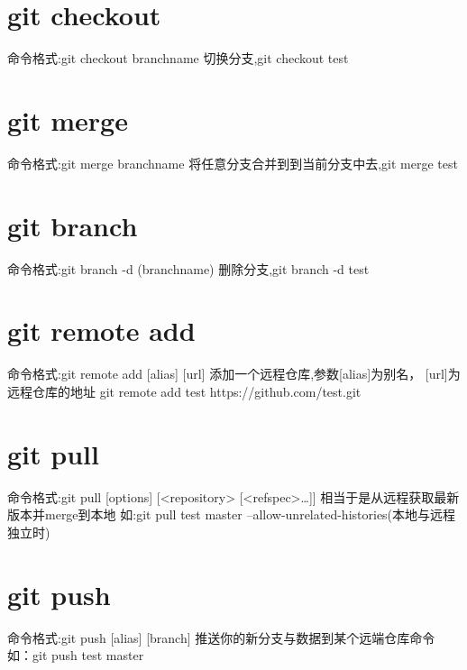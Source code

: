 \documentclass[a4paper, 12pt]{article}
\begin{document}
	\section{git checkout}
	{\color{blue} 命令格式:git checkout branchname}
	切换分支,git checkout test
	
	\section{git merge}
	{\color{blue} 命令格式:git merge branchname}
	将任意分支合并到到当前分支中去,git merge test
	
	\section{git branch}
	{\color{blue} 命令格式:git branch -d (branchname)}
	删除分支,git branch -d test
		
	\section{git remote add}
	{\color{blue} 命令格式:git remote add [alias] [url]}
	添加一个远程仓库,参数[alias]为别名， [url]为远程仓库的地址
	git remote add test https://github.com/test.git
			
	\section{git pull}
	{\color{blue} 命令格式:git pull [options] [<repository> [<refspec>…]]}
	相当于是从远程获取最新版本并merge到本地	
	如:git pull test master --allow-unrelated-histories(本地与远程独立时)
			
	\section{git push}
	{\color{blue} 命令格式:git push [alias] [branch]}
	推送你的新分支与数据到某个远端仓库命令
	如：git push test master
	
\end{document}
